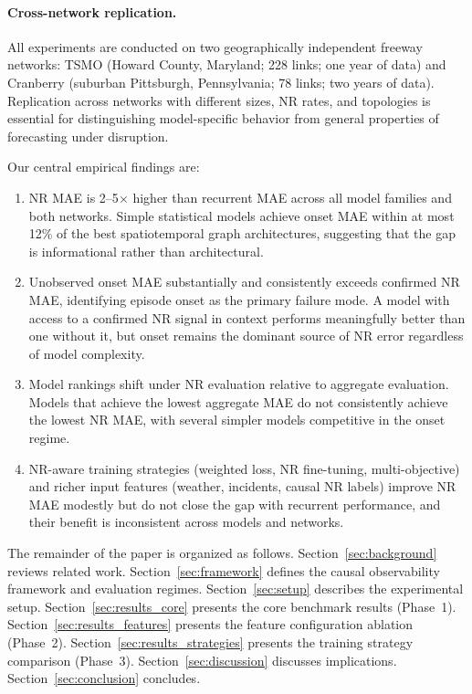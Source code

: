 \documentclass[a4paper]{cas-sc}
\begin{document}
\paragraph{Cross-network replication.}
All experiments are conducted on two geographically independent
freeway networks: TSMO (Howard County, Maryland; 228 links;
one year of data) and Cranberry (suburban Pittsburgh, Pennsylvania;
78 links; two years of data).
Replication across networks with different sizes, NR rates, and
topologies is essential for distinguishing model-specific behavior
from general properties of forecasting under disruption.

Our central empirical findings are:
\begin{enumerate}
  \item NR MAE is 2--5$\times$ higher than recurrent MAE across all
        model families and both networks. Simple statistical models
        achieve onset MAE within at most 12\% of the best spatiotemporal
        graph architectures, suggesting that the gap is
        informational rather than architectural.
  \item Unobserved onset MAE substantially and consistently exceeds
        confirmed NR MAE, identifying episode onset as the primary
        failure mode. A model with access to a confirmed NR signal
        in context performs meaningfully better than one without it,
        but onset remains the dominant source of NR error regardless
        of model complexity.
  \item Model rankings shift under NR evaluation relative to
        aggregate evaluation. Models that achieve the lowest aggregate
        MAE do not consistently achieve the lowest NR MAE, with
        several simpler models competitive in the onset regime.
  \item NR-aware training strategies (weighted loss, NR fine-tuning,
        multi-objective) and richer input features (weather, incidents,
        causal NR labels) improve NR MAE modestly but do not close the
        gap with recurrent performance, and their benefit is
        inconsistent across models and networks.
\end{enumerate}

The remainder of the paper is organized as follows.
Section~\ref{sec:background} reviews related work.
Section~\ref{sec:framework} defines the causal observability framework
and evaluation regimes.
Section~\ref{sec:setup} describes the experimental setup.
Section~\ref{sec:results_core} presents the core benchmark results
(Phase~1).
Section~\ref{sec:results_features} presents the feature configuration
ablation (Phase~2).
Section~\ref{sec:results_strategies} presents the training strategy
comparison (Phase~3).
Section~\ref{sec:discussion} discusses implications.
Section~\ref{sec:conclusion} concludes.
\end{document}
